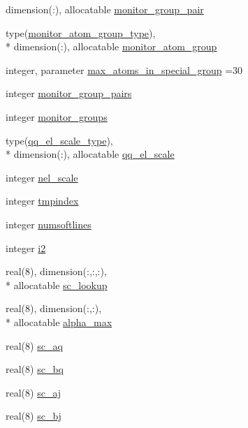 \begin{DoxyCompactItemize}
dimension(\-:), allocatable \hyperlink{classqatom_ad8e7674c5d54028519bc6bf0a478b406}{monitor\-\_\-group\-\_\-pair}
\item 
type(\hyperlink{structqatom_1_1monitor__atom__group__type}{monitor\-\_\-atom\-\_\-group\-\_\-type}), \\*
dimension(\-:), allocatable \hyperlink{classqatom_a352dcbf92faa65e207f697f694626a05}{monitor\-\_\-atom\-\_\-group}
\item 
integer, parameter \hyperlink{classqatom_a6c96fd8bffab81fc806521b1099447d7}{max\-\_\-atoms\-\_\-in\-\_\-special\-\_\-group} =30
\item 
integer \hyperlink{classqatom_ab181049f3af87e317940072e8dcb0b8c}{monitor\-\_\-group\-\_\-pairs}
\item 
integer \hyperlink{classqatom_a5a430edee24994b0451d502eeba4354d}{monitor\-\_\-groups}
\item 
type(\hyperlink{structqatom_1_1qq__el__scale__type}{qq\-\_\-el\-\_\-scale\-\_\-type}), \\*
dimension(\-:), allocatable \hyperlink{classqatom_a40ab497921d3e628b1881dca1bb118ad}{qq\-\_\-el\-\_\-scale}
\item 
integer \hyperlink{classqatom_a1faef5321ae7b901fb70e24a9f56c40b}{nel\-\_\-scale}
\item 
integer \hyperlink{classqatom_ac84c7edf661c77c14c60cdcb6ee92973}{tmpindex}
\item 
integer \hyperlink{classqatom_a71b6ebba3830ff9fe1f2066c379301bd}{numsoftlines}
\item 
integer \hyperlink{classqatom_a9b9c6e05cf898fc0e178dd98559a901b}{i2}
\item 
real(8), dimension(\-:,\-:,\-:), \\*
allocatable \hyperlink{classqatom_a9ca6379ec541fa296e227ea83bcf6f94}{sc\-\_\-lookup}
\item 
real(8), dimension(\-:,\-:), \\*
allocatable \hyperlink{classqatom_a539962282a5ac4df02663098dd0b9c28}{alpha\-\_\-max}
\item 
real(8) \hyperlink{classqatom_af56339fd8259d6632f7e06c37e9deaa7}{sc\-\_\-aq}
\item 
real(8) \hyperlink{classqatom_acc86f0be8389897d652e9d809d4e2eca}{sc\-\_\-bq}
\item 
real(8) \hyperlink{classqatom_a4d79d466c4cb3aa0de5b1b066b07837f}{sc\-\_\-aj}
\item 
real(8) \hyperlink{classqatom_a168762bea0f4f31236cd876b85ca85e6}{sc\-\_\-bj}
\item 

\end{DoxyCompactItemize}
